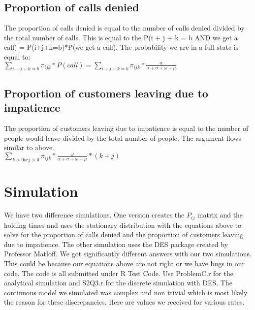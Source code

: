\documentclass[10pt,a4paper]{article}
\begin{document}
\subsection{Proportion of calls denied}
The proportion of calls denied is equal to the number of calls denied divided by the total number of calls. This is equal to the P(i + j + k = b AND we get a call) = P(i+j+k=b)*P(we get a call). The probability we are in a full state is equal to:\\
$\sum\limits_{i+j+k = b} \pi_{ijk}*P(call) = \sum\limits_{i+j+k = b} \pi_{ijk}*\frac{\alpha}{\alpha + \sigma + \omega + \mu}$
\subsection{Proportion of customers leaving due to impatience}
The proportion of customers leaving due to impatience is equal to the number of people would leave divided by the total number of people. The argument flows similar to above.\\
$\sum\limits_{k > 0 or j > 0} \pi_{ijk}*\frac{\omega}{\alpha + \sigma + \omega + \mu}*(k+j)$
\section{Simulation}
We have two difference simulations. One version creates the $P_{ij}$ matrix and the holding times and uses the stationary distribution with the equations above to solve for the proportion of calls denied and the proportion of customers leaving due to impatience. The other simulation uses the DES package created by Professor Matloff. We got significantly different answers with our two simulations. This could be because our equations above are not right or we have bugs in our code. The code is all submitted under R Test Code. Use ProblemC.r for the analytical simulation and S2Q3.r for the discrete simulation with DES. The continuous model we simulated was complex and non trivial which is most likely the reason for these discrepancies. Here are values we received for various rates.


\end{document}

